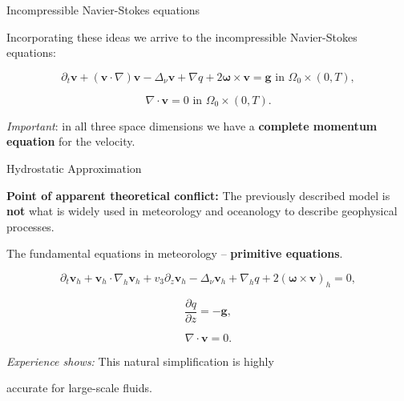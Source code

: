 \documentclass{beamer}
\begin{document}
\begin{frame}{Incompressible Navier-Stokes equations}

Incorporating these ideas we arrive to the incompressible Navier-Stokes equations:

$$ \partial_t \mathbf{v} + (\mathbf{v} \cdot \nabla)\mathbf{v} -\Delta_{\nu} \mathbf{v} + \nabla q + 2 \mathbf{\omega} \times \mathbf{v}= \mathbf{g} \text{ in } \Omega_0 \times (0,T), $$
    
$$ \nabla \cdot \mathbf{v} = 0 \text{ in } \Omega_0 \times (0,T). $$

\textit{Important}: in all three space dimensions we have a \textbf{complete momentum equation} for the velocity.

\end{frame}

\begin{frame}{Hydrostatic Approximation}

\textbf{Point of apparent theoretical conflict:} The previously described model is \textbf{not} what is widely used in meteorology and oceanology to describe geophysical processes.

The fundamental equations in meteorology -- \textbf{primitive equations}.

$$ \partial_t \mathbf{v}_h + \mathbf{v}_h \cdot \nabla_h \mathbf{v}_h + v_3 \partial_z \mathbf{v}_h - \Delta_{\nu} \mathbf{v}_h + \nabla_h q + 2 (\mathbf{\omega} \times \mathbf{v})_h = 0, $$

$$ \frac{\partial q}{\partial z} = - \mathbf{g}, $$

$$ \nabla \cdot \mathbf{v} = 0. $$

\begin{center}
\textit{Experience shows:} This natural simplification is highly

accurate for large-scale fluids. 
\end{center}

\end{frame}
\end{document}
